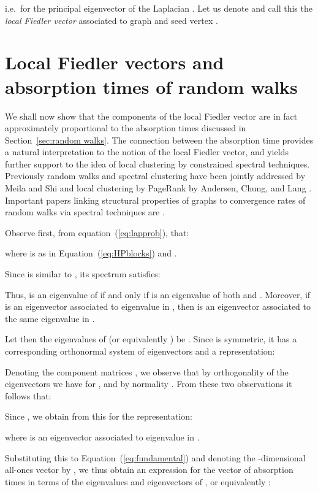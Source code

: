 \documentclass{article}
\begin{document}
i.e.\  for the principal eigenvector 
 of the Laplacian . Let us denote  and call
this the \emph{local Fiedler vector} associated to graph  and
seed vertex . 

\section{Local Fiedler vectors and absorption times of random walks}

We shall now show that the components of the local Fiedler vector  are in fact approximately proportional to the
absorption times  discussed in Section~\ref{sec:random walks}.
The connection between the absorption time provides a natural
interpretation to the notion of the local Fiedler vector, and yields
further support to the idea of local clustering by constrained
spectral techniques. Previously random walks and spectral clustering
have been jointly addressed by Meila and Shi \cite{MiSh01} and local
clustering by PageRank by Andersen, Chung, and Lang \cite{dirlocal}.
Important papers linking structural properties of graphs to convergence
rates of random walks via spectral techniques are \cite{Alon86,SiJe89}.

Observe first, from equation~(\ref{eq:lapprob}), that:

where  is as in Equation~(\ref{eq:HPblocks})
and .

Since  is similar to , its spectrum satisfies:

Thus,  is an eigenvalue of 
if and only if 
is an eigenvalue of both  and .
Moreover, if  is an eigenvector associated to eigenvalue
 in , then  is an
eigenvector associated to the same eigenvalue in .


Let then the eigenvalues of  (or equivalently ) be .  Since  is symmetric, it
has a corresponding orthonormal system of eigenvectors
 and a representation:

Denoting the component matrices
, we observe that by
orthogonality of the eigenvectors we have
 for , and by normality .
From these two observations it follows that:

Since ,
we obtain from this for  the representation:

where  is an eigenvector associated
to eigenvalue  in .

Substituting this to Equation~(\ref{eq:fundamental}) and denoting
the -dimensional all-ones vector by , we thus obtain
an expression for the vector  of absorption times 
in terms of the eigenvalues and eigenvectors of , or
equivalently :
\end{document}

